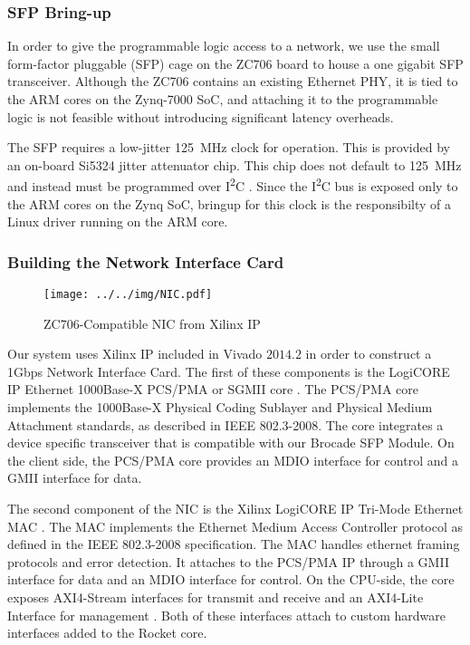 \subsubsection {SFP Bring-up}
    In order to give the programmable logic access to a network, we use 
    the small form-factor pluggable (SFP) cage on the ZC706 board to house a 
    one gigabit SFP transceiver. Although the ZC706 contains an existing Ethernet
    PHY, it is tied to the ARM cores on the Zynq-7000 SoC, and attaching it to 
    the programmable logic is not feasible without introducing significant 
    latency overheads.

    The SFP requires a low-jitter \SI{125}{\mega\hertz} clock for operation. This is provided
    by an on-board Si5324 jitter attenuator chip. This chip does not default to 
    \SI{125}{\mega\hertz} and instead must be programmed over I\textsuperscript{2}C \cite{xapp1082}. Since the I\textsuperscript{2}C bus is exposed
    only to the ARM cores on the Zynq SoC, bringup for this clock is the 
    responsibilty of a Linux driver running on the ARM core.

\subsubsection{Building the Network Interface Card}

\begin{figure}[t]
\begin{center}
\label{fig:nic}
\texttt{[image: ../../img/NIC.pdf]}
\caption{ZC706-Compatible NIC from Xilinx IP}
\end{center}
\end{figure}

    Our system uses Xilinx IP included in Vivado $2014.2$ in order to construct 
    a 1Gbps Network Interface Card. The first of these components is the LogiCORE
    IP Ethernet 1000Base-X PCS/PMA or SGMII core \cite{pcspma}. The PCS/PMA
    core implements the 1000Base-X Physical Coding Sublayer and Physical Medium
    Attachment standards, as described in IEEE 802.3-2008. The core integrates
    a device specific transceiver that is compatible with our Brocade SFP Module.
    On the client side, the PCS/PMA core provides an MDIO interface for control
    and a GMII interface for data.

    The second component of the NIC is the Xilinx LogiCORE IP Tri-Mode Ethernet 
    MAC \cite{trimac}. The MAC implements the Ethernet Medium Access Controller
    protocol as defined in the IEEE 802.3-2008 specification. The MAC handles
    ethernet framing protocols and error detection. It attaches to the PCS/PMA
    IP through a GMII interface for data and an MDIO interface for control.
    On the CPU-side, the core exposes AXI4-Stream interfaces for transmit and 
    receive and an AXI4-Lite Interface for management \cite{axi}. Both of these
    interfaces attach to custom hardware interfaces added to the Rocket core.


